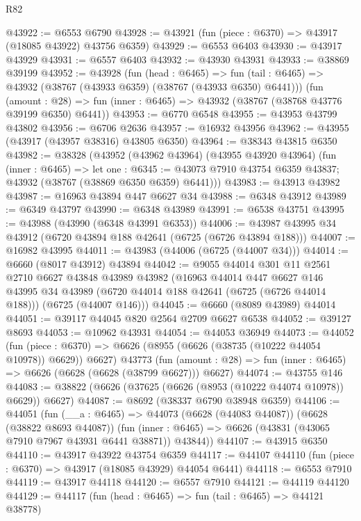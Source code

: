 \begin{lexlean}{R82}
\begin{coremodule}
@43922 := @6553 @6790
@43928 := @43921 (fun (piece : @6370) => @43917 (@18085 @43922) @43756 @6359)
@43929 := @6553 @6403
@43930 := @43917 @43929
@43931 := @6557 @6403
@43932 := @43930 @43931
@43933 := @38869 @39199
@43952 := @43928
    (fun (head : @6465) =>
    fun (tail : @6465) => @43932 (@38767 (@43933 @6359) (@38767 (@43933 @6350) @6441)))
    (fun (amount : @28) =>
    fun (inner : @6465) => @43932 (@38767 (@38768 @43776 @39199 @6350) @6441))
@43953 := @6770 @6548
@43955 := @43953 @43799 @43802
@43956 := @6706 @2636
@43957 := @16932 @43956
@43962 := @43955 (@43917 (@43957 @38316) @43805 @6350)
@43964 := @38343 @43815 @6350
@43982 := @38328
    (@43952
      (@43962 @43964)
      (@43955 @43920 @43964)
      (fun (inner : @6465) =>
      let one : @6345 := @43073 @7910 @43754 @6359 @43837;
      @43932 (@38767 (@38869 @6350 @6359) @6441)))
@43983 := @43913 @43982
@43987 := @16963 @43894 @447 @6627 @34
@43988 := @6348 @43912
@43989 := @6349 @43797
@43990 := @6348 @43989
@43991 := @6538 @43751
@43995 := @43988 (@43990 (@6348 @43991 @6353))
@44006 := @43987 @43995 @34 @43912 (@6720 @43894 @188 @42641 (@6725 (@6726 @43894 @188)))
@44007 := @16982 @43995
@44011 := @43983 (@44006 (@6725 (@44007 @34)))
@44014 := @6660 (@8017 @43912) @43894
@44042 := @9055
    @44014
    @301
    @11
    @2561
    @2710
    @6627
    @43848
    @43989
    @43982
    (@16963
      @44014
      @447
      @6627
      @146
      @43995
      @34
      @43989
      (@6720 @44014 @188 @42641 (@6725 (@6726 @44014 @188)))
      (@6725 (@44007 @146)))
@44045 := @6660 (@8089 @43989) @44014
@44051 := @39117 @44045 @820 @2564 @2709 @6627 @6538
@44052 := @39127 @8693
@44053 := @10962 @43931
@44054 := @44053 @36949
@44073 := @44052
    (fun (piece : @6370) => @6626 (@8955 (@6626 (@38735 (@10222 @44054 @10978)) @6629)) @6627)
    @43773
    (fun (amount : @28) => fun (inner : @6465) => @6626 (@6628 (@6628 (@38799 @6627))) @6627)
@44074 := @43755 @146
@44083 := @38822 (@6626 (@37625 (@6626 (@8953 (@10222 @44074 @10978)) @6629)) @6627)
@44087 := @8692 (@38337 @6790 @38948 @6359)
@44106 := @44051
    (fun (__a : @6465) =>
    @44073
      (@6628 (@44083 @44087))
      (@6628 (@38822 @8693 @44087))
      (fun (inner : @6465) => @6626 (@43831 (@43065 @7910 @7967 @43931 @6441 @38871)) @43844))
@44107 := @43915 @6350
@44110 := @43917 @43922 @43754 @6359
@44117 := @44107 @44110 (fun (piece : @6370) => @43917 (@18085 @43929) @44054 @6441)
@44118 := @6553 @7910
@44119 := @43917 @44118
@44120 := @6557 @7910
@44121 := @44119 @44120
@44129 := @44117
    (fun (head : @6465) => fun (tail : @6465) => @44121 @38778)

\end{coremodule}
\end{lexlean}
